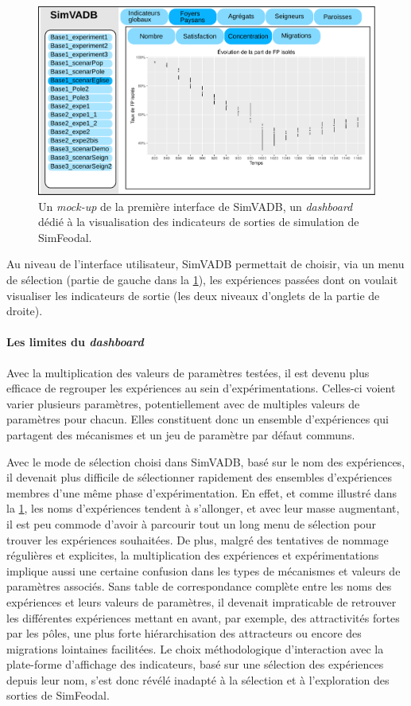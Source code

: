 \begin{figure}[H]
	\centering
	\includegraphics[width=\linewidth]{img/simvadb_mockup.pdf}
	\caption{Un \textit{mock-up} de la première interface de SimVADB, un \textit{dashboard} dédié à la visualisation des indicateurs de sorties de simulation de SimFeodal.}
	\label{fig:mockup_simvadb}
\end{figure}

	Au niveau de l'interface utilisateur, SimVADB permettait de choisir, via un menu de sélection (partie de gauche dans la \cref{fig:mockup_simvadb}), les expériences passées dont on voulait visualiser les indicateurs de sortie (les deux niveaux d'onglets de la partie de droite).

	
	\paragraph{Les limites du \textit{dashboard}}
	Avec la multiplication des valeurs de paramètres testées, il est devenu plus efficace de regrouper les expériences au sein d'expérimentations.
	Celles-ci voient varier plusieurs paramètres, potentiellement avec de multiples valeurs de paramètres pour chacun.
	Elles constituent donc un ensemble d'expériences qui partagent des mécanismes et un jeu de paramètre par défaut communs.

	Avec le mode de sélection choisi dans SimVADB, basé sur le nom des expériences, il devenait plus difficile de sélectionner rapidement des ensembles d'expériences membres d'une même phase d'expérimentation.
	En effet, et comme illustré dans la \cref{fig:mockup_simvadb}, les noms d'expériences tendent à s'allonger, et avec leur masse augmentant, il est peu commode d'avoir à parcourir tout un long menu de sélection pour trouver les expériences souhaitées.
	De plus, malgré des tentatives de nommage régulières et explicites, la multiplication des expériences et expérimentations implique aussi une certaine confusion dans les types de mécanismes et valeurs de paramètres associés.
	Sans table de correspondance complète entre les noms des expériences et leurs valeurs de paramètres, il devenait impraticable de retrouver les différentes expériences mettant en avant, par exemple, des attractivités fortes par les pôles, une plus forte hiérarchisation des attracteurs ou encore des migrations lointaines facilitées.
	Le choix méthodologique d'interaction avec la plate-forme d'affichage des indicateurs, basé sur une sélection des expériences depuis leur nom, s'est donc révélé inadapté à la sélection et à l'exploration des sorties de SimFeodal.
	
